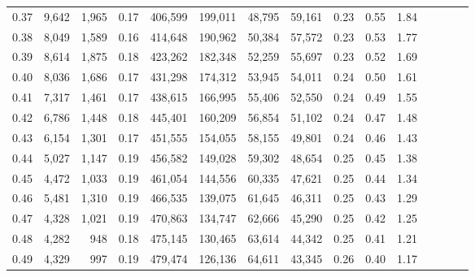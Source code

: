 \begin{tabular}{rrrcrrrrrrrrrrr}
0.37 &   9,642 &  1,965 &                                       0.17 &  406,599 &  199,011 &   48,795 &   59,161 &  0.23 &  0.55 &                         1.84 \\
0.38 &   8,049 &  1,589 &                                       0.16 &  414,648 &  190,962 &   50,384 &   57,572 &  0.23 &  0.53 &                         1.77 \\
0.39 &   8,614 &  1,875 &                                       0.18 &  423,262 &  182,348 &   52,259 &   55,697 &  0.23 &  0.52 &                         1.69 \\
0.40 &   8,036 &  1,686 &                                       0.17 &  431,298 &  174,312 &   53,945 &   54,011 &  0.24 &  0.50 &                         1.61 \\
0.41 &   7,317 &  1,461 &                                       0.17 &  438,615 &  166,995 &   55,406 &   52,550 &  0.24 &  0.49 &                         1.55 \\
0.42 &   6,786 &  1,448 &                                       0.18 &  445,401 &  160,209 &   56,854 &   51,102 &  0.24 &  0.47 &                         1.48 \\
0.43 &   6,154 &  1,301 &                                       0.17 &  451,555 &  154,055 &   58,155 &   49,801 &  0.24 &  0.46 &                         1.43 \\
0.44 &   5,027 &  1,147 &                                       0.19 &  456,582 &  149,028 &   59,302 &   48,654 &  0.25 &  0.45 &                         1.38 \\
0.45 &   4,472 &  1,033 &                                       0.19 &  461,054 &  144,556 &   60,335 &   47,621 &  0.25 &  0.44 &                         1.34 \\
0.46 &   5,481 &  1,310 &                                       0.19 &  466,535 &  139,075 &   61,645 &   46,311 &  0.25 &  0.43 &                         1.29 \\
0.47 &   4,328 &  1,021 &                                       0.19 &  470,863 &  134,747 &   62,666 &   45,290 &  0.25 &  0.42 &                         1.25 \\
0.48 &   4,282 &    948 &                                       0.18 &  475,145 &  130,465 &   63,614 &   44,342 &  0.25 &  0.41 &                         1.21 \\
0.49 &   4,329 &    997 &                                       0.19 &  479,474 &  126,136 &   64,611 &   43,345 &  0.26 &  0.40 &                         1.17 \\

\end{tabular}
